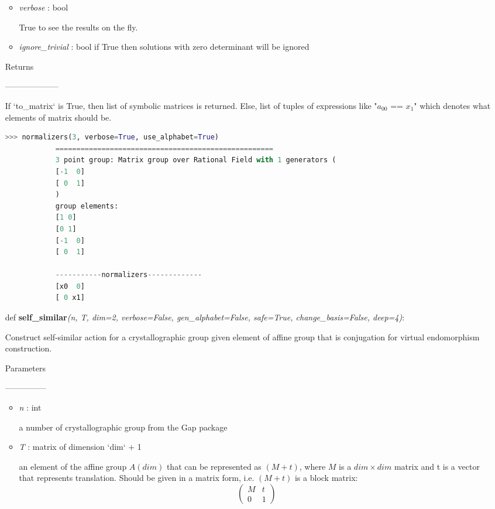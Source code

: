 \documentclass[a4paper,12pt]{amsart}
\theoremstyle{definition}
\begin{document}
\begin{itemize}
\begin{itemize}
			\item \textit{verbose} : bool
		
			True to see the results on the fly.
			
			\item \textit{ignore\_trivial} : bool
			if True then solutions with zero determinant will be ignored
								
		\end{itemize}
		
		Returns
		
		--------------------
		
		If `to\_matrix` is True, then list of symbolic matrices is returned.
		Else, list of tuples of expressions like "$a_{00}$ == $x_1$" which denotes
		what elements of matrix should be.
		
		\begin{lstlisting}[language=python]
			>>> normalizers(3, verbose=True, use_alphabet=True)
			====================================================
			3 point group: Matrix group over Rational Field with 1 generators (
			[-1  0]
			[ 0  1]
			)
			group elements:
			[1 0]
			[0 1]
			[-1  0]
			[ 0  1]
			
			-----------normalizers-------------
			[x0  0]
			[ 0 x1]
		\end{lstlisting}
		
		\vskip 1cm
		 
		
		\item[def]  \textbf{self\_similar}\textit{(n, T, dim=2, verbose=False,
		gen\_alphabet=False, safe=True, change\_basis=False, deep=4)}:
		
		Construct self-similar action for a crystallographic group
		given element of affine group that is conjugation for virtual
		endomorphism construction.
		
		
		Parameters
		
		---------------
		
		
		\begin{itemize}
			\item \textit{n} : int
			
			a number of crystallographic group from the Gap package
			
			\item \textit{T} : matrix of dimension `dim` + 1
			
			an element of the affine group $A(dim)$ that can be represented as
			$(M + t)$, where $M$ is a $dim \times dim$ matrix and t is a vector that represents
			translation. Should be given in a matrix form, i.e. $(M + t)$ is a
			block matrix:
			$$
			\left(\begin{array}{c|c}
				M & t \\ 
				\hline 
				0 & 1
			\end{array}\right)
			$$
			

\end{itemize}
\end{itemize}
\end{document}
